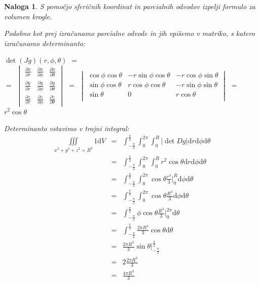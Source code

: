\documentclass[12pt, a4paper]{article}
\newtheorem{naloga}{Naloga}
\begin{document}
\begin{naloga}
S pomočjo sferičnih koordinat in parcialnih odvodov izpelji formulo za volumen krogle.

\emph{Podobno kot prej izračunamo parcialne odvode in jih vpišemo v matriko, s katero izračunamo determinanto:}
\\
\begin{center}
$ \det (Jg)(r,\phi, \theta)$ $=$  \\ $=$ \large  $\begin{vmatrix} \frac{\partial x}{\partial r}  &  \frac{\partial x}{\partial \phi} &  \frac{\partial x}{\partial \theta} \\  \frac{\partial y}{\partial r}  &  \frac{\partial y}{\partial \phi} &  \frac{\partial y}{\partial \theta} \\ \frac{\partial z}{\partial r}  &  \frac{\partial z}{\partial \phi} &  \frac{\partial z}{\partial \theta} \end{vmatrix} $ 
$=$  \normalsize $ \begin{vmatrix} \cos \phi  \cos \theta & -r \sin \phi  \cos \theta & -r \cos \phi  \sin \theta \\ \sin \phi  \cos \theta  & r \cos \phi  \cos \theta  & -r \sin \phi  \sin \theta \\ \sin \theta  & 0  & r \cos \theta \\ \end{vmatrix} $  $=$ $r^2 \cos \theta $
\end{center}

\emph{Determinanto vstavimo v trojni integral:} \\



\begin{eqnarray*}
\iiint\limits_{x^2+y^2+z^2=R^2} 1 \mathrm{d} V &=& \int^{\frac {\pi}{2}}_{- \frac {\pi}{2}} \int^{2\pi}_{0} \int^{R}_{0}  \big | \det Dg \big | \mathrm{d} r \mathrm{d}\phi \mathrm{d}\theta \\
 &=&  \int^{\frac {\pi}{2}}_{- \frac {\pi}{2}} \int^{2\pi}_{0} \int^{R}_{0}   r^2 \cos \theta   \mathrm{d} r \mathrm{d}\phi \mathrm{d}\theta  \\
 &=&  \int^{\frac {\pi}{2}}_{- \frac {\pi}{2}} \int^{2\pi}_{0} \cos \theta \frac {r^3}{3} \big |^{R}_{0} \mathrm{d}\phi \mathrm{d}\theta  \\
 &=&  \int^{\frac {\pi}{2}}_{- \frac {\pi}{2}} \int^{2\pi}_{0} \cos \theta \frac {R^3}{3} \mathrm{d}\phi \mathrm{d}\theta  \\
 &=&  \int^{\frac {\pi}{2}}_{- \frac {\pi}{2}} \phi \cos \theta \frac {R^3}{3} \big |^{2 \pi}_{0} \mathrm{d} \theta  \\
 &=&  \int^{\frac {\pi}{2}}_{- \frac {\pi}{2}} \frac {2 \pi R^3}{3} \cos \theta \mathrm{d} \theta  \\
 &=&  \frac {2 \pi R^3}{3} \sin \theta \big |^{\frac {\pi}{2}}_{-\frac {\pi}{2}}  \\
 &=&  2 \frac {2 \pi R^3}{3}  \\
 &=&  \frac {4 \pi R^3}{3}  \\
\end{eqnarray*}


\end{naloga}
\end{document}
